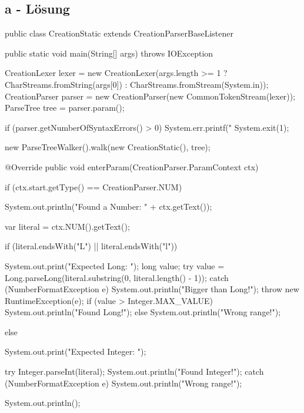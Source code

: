 \subsection*{a - Lösung}
\newline
\begin{code}[language=java, caption={ParserListener für statische Syntax}, label={lst:Aufgabe3a}]
public class CreationStatic extends CreationParserBaseListener {

    public static void main(String[] args) throws IOException {
        CreationLexer lexer = new CreationLexer(args.length >= 1 ?
        CharStreams.fromString(args[0]) : CharStreams.fromStream(System.in));
        CreationParser parser = new CreationParser(new CommonTokenStream(lexer));
        ParseTree tree = parser.param();

        if (parser.getNumberOfSyntaxErrors() > 0) {
            System.err.printf("%
            System.exit(1);
        }

        new ParseTreeWalker().walk(new CreationStatic(), tree);
    }

    @Override
    public void enterParam(CreationParser.ParamContext ctx) {

        if (ctx.start.getType() == CreationParser.NUM) {
            System.out.println("Found a Number: " + ctx.getText());

            var literal = ctx.NUM().getText();

            if (literal.endsWith("L") || literal.endsWith("l")) {
                System.out.print("Expected Long: ");
                long value;
                try {
                    value = Long.parseLong(literal.substring(0, literal.length() - 1));
                } catch (NumberFormatException e) {
                    System.out.println("Bigger than Long!");
                    throw new RuntimeException(e);
                }
                if (value > Integer.MAX_VALUE) {
                    System.out.println("Found Long!");
                } else {
                    System.out.println("Wrong range!");
                }

            } else {
                System.out.print("Expected Integer: ");

                try {
                    Integer.parseInt(literal);
                    System.out.println("Found Integer!");
                } catch (NumberFormatException e) {
                    System.out.println("Wrong range!");
                }
            }
            System.out.println();
        }
    }
}
\end{code}
\newline

